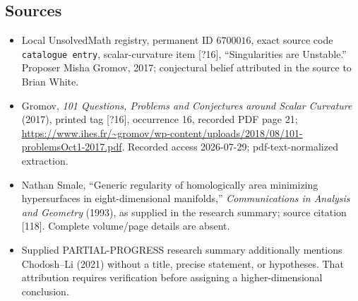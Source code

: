 \documentclass[11pt]{article}
\begin{document}
\subsection{Sources}
\begin{itemize}
\item Local UnsolvedMath registry, permanent ID \(6700016\), exact source code \texttt{catalogue entry}, scalar-curvature item [?16], ``Singularities are Unstable.'' Proposer Misha Gromov, 2017; conjectural belief attributed in the source to Brian White.
\item Gromov, \emph{101 Questions, Problems and Conjectures around Scalar Curvature} (2017), printed tag [?16], occurrence 16, recorded PDF page 21; \url{https://www.ihes.fr/~gromov/wp-content/uploads/2018/08/101-problemsOct1-2017.pdf}. Recorded access 2026-07-29; pdf-text-normalized extraction.
\item Nathan Smale, ``Generic regularity of homologically area minimizing hypersurfaces in eight-dimensional manifolds,'' \emph{Communications in Analysis and Geometry} (1993), as supplied in the research summary; source citation [118]. Complete volume/page details are absent.
\item Supplied PARTIAL-PROGRESS research summary additionally mentions Chodosh--Li (2021) without a title, precise statement, or hypotheses. That attribution requires verification before assigning a higher-dimensional conclusion.
\end{itemize}
\end{document}
